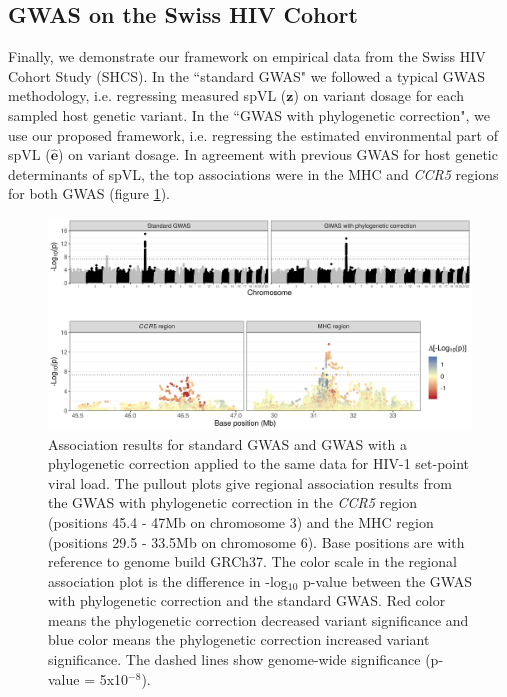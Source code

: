 \documentclass[]{article}
\begin{document}
\begin{doublespace}
\subsection{GWAS on the Swiss HIV Cohort}

Finally, we demonstrate our framework on empirical data from the Swiss HIV Cohort Study (SHCS). In the ``standard GWAS" we followed a typical GWAS methodology,  i.e. regressing measured spVL ($\bm{z}$) on variant dosage for each sampled host genetic variant. In the ``GWAS with phylogenetic correction", we use our proposed framework, i.e. regressing the estimated environmental part of spVL ($\bm{\hat{e}}$) on variant dosage. In agreement with previous GWAS for host genetic determinants of spVL, the top associations were in the MHC and \emph{CCR5} regions for both GWAS (figure \ref{fig:gwas-results}). 

\begin{figure}[H]
	\begin{center}
		\includegraphics[width=\linewidth]{figures/200207_gwas_results}
		\caption{Association results for standard GWAS and GWAS with a phylogenetic correction applied to the same data for HIV-1 set-point viral load. The pullout plots give regional association results from the GWAS with phylogenetic correction in the \emph{CCR5} region (positions 45.4 - 47Mb on chromosome 3) and the MHC region (positions 29.5 - 33.5Mb on chromosome 6). Base positions are with reference to genome build GRCh37. The color scale in the regional association plot is the difference in -log$_{10}$ p-value between the GWAS with phylogenetic correction and the standard GWAS. Red color means the phylogenetic correction decreased variant significance and blue color means the phylogenetic correction increased variant significance. The dashed lines show genome-wide significance (p-value = 5x10$^{-8}$).}
		\label{fig:gwas-results}
	\end{center}
\end{figure}


\end{doublespace}
\end{document}
